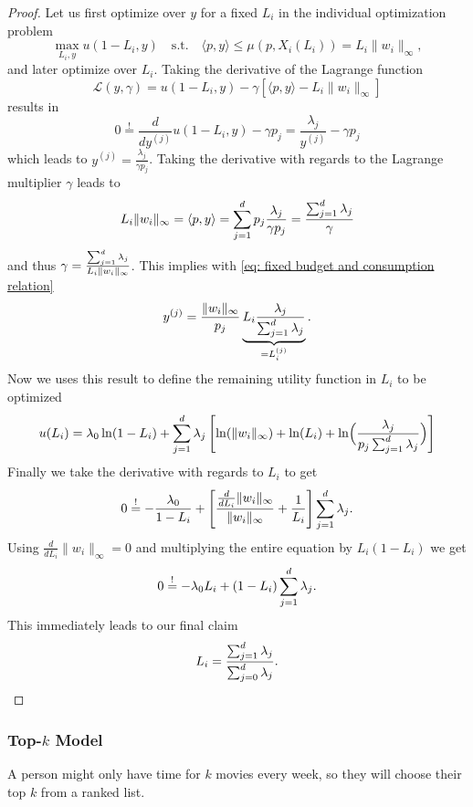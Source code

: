 \begin{proof}
	Let us first optimize over \(y\) for a fixed \(L_i\) in the individual
	optimization problem
	\[
		\max_{L_i, y} u(1-L_i, y)
		\quad \text{s.t.}\quad
		\langle p, y\rangle \le \mu(p, X_i(L_i)) = L_i \|w_i\|_\infty,
	\]
	and later optimize over \(L_i\). Taking the derivative of the Lagrange
	function
	\[
		\mathcal{L}	(y, \gamma)
		= u(1-L_i, y) - \gamma [\langle p, y\rangle - L_i\|w_i\|_\infty]
	\]
	results in
	\[
		0\overset!= \frac{d}{d y^{(j)}}u(1-L_i,y) - \gamma p_j
		= \frac{\lambda_j}{y^{(j)}} - \gamma p_j
	\]
	which leads to \(y^{(j)} = \frac{\lambda_j}{\gamma p_j}\). Taking the
	derivative with regards to the Lagrange multiplier \(\gamma\) leads to
	\[
		L_i\|w_i\|_\infty = \langle p, y\rangle
		= \sum_{j=1}^d p_j \frac{\lambda_j}{\gamma p_j}
		= \frac{\sum_{j=1}^d \lambda_j}\gamma
	\]
	and thus \(\gamma = \frac{\sum_{j=1}^d \lambda_j}{L_i\|w_i\|_\infty}\).
	This implies with \eqref{eq: fixed budget and consumption relation}
	\[
		y^{(j)}
		= \frac{\|w_i\|_\infty}{p_j}
		\underbrace{L_i\frac{\lambda_j}{\sum_{j=1}^d \lambda_j}}_{=L_i^{(j)}}.
	\]
	Now we uses this result to define the remaining utility function in \(L_i\) 
	to be optimized
	\[
		u(L_i) = \lambda_0 \ln(1-L_i) + \sum_{j=1}^d \lambda_j \left[
			\ln(\|w_i\|_\infty) + \ln(L_i) + \ln\Bigl(\frac{\lambda_j}{p_j\sum_{j=1}^d \lambda_j}\Bigr)
		\right]
	\]
	Finally we take the derivative with regards to \(L_i\) to get
	\[
		0\overset!= -\frac{\lambda_0}{1-L_i}
		+ \left[
			\frac{\frac{d}{dL_i}\|w_i\|_\infty}{\|w_i\|_\infty}
			+ \frac1{L_i}
		\right]\sum_{j=1}^d \lambda_j.
	\]
	Using \(\frac{d}{dL_i}\|w_i\|_\infty = 0\) 
	and multiplying the entire equation by \(L_i(1-L_i)\) we get
	\[
		0\overset!= -\lambda_0L_i + (1-L_i)\sum_{j=1}^d \lambda_j.
	\]
	This immediately leads to our final claim
	\[
		L_i = \frac{\sum_{j=1}^d \lambda_j}{\sum_{j=0}^d \lambda_j}.
		\qedhere
	\]
\end{proof}

\subsubsection{Top-\texorpdfstring{\(k\)}{k} Model}

A person might only have time for \(k\) movies every week, so they will choose
their top \(k\) from a ranked list.
